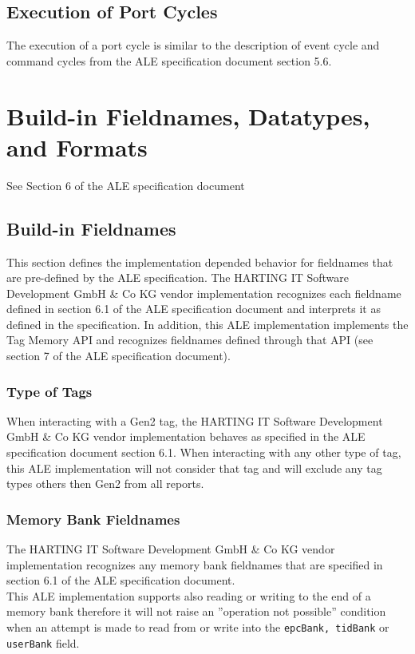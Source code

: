 \documentclass[11pt,a4paper,oneside]{article}
\begin{document}
\subsection{Execution of Port Cycles}
\label{subsec:Execution}
The execution of a port cycle is similar to the description of event cycle and command cycles from the ALE specification document section 5.6.

\section{Build-in Fieldnames, Datatypes, and Formats}
See Section 6 of the ALE specification document

\subsection{	Build-in Fieldnames}
This section defines the implementation depended behavior for fieldnames that are pre-defined by the ALE specification. The HARTING IT Software Development GmbH \& Co KG  vendor implementation recognizes each fieldname defined in section 6.1 of the ALE specification document and interprets it as defined in the specification. In addition, this ALE implementation implements the Tag Memory API and recognizes fieldnames defined through that API (see section 7 of the ALE specification document).

\subsubsection{Type of Tags}
When interacting with a Gen2 tag, the HARTING IT Software Development GmbH \& Co KG  vendor implementation behaves as specified in the ALE specification document section 6.1. When interacting with any other type of tag, this ALE implementation will not consider that tag and will exclude any tag types others then Gen2 from all reports.

\subsubsection{Memory Bank Fieldnames}
The HARTING IT Software Development GmbH \& Co KG  vendor implementation recognizes any memory bank fieldnames that are specified in section 6.1 of the ALE specification document.\\
 This ALE implementation supports also reading or writing to the end of a memory bank therefore it will not raise an  ''operation not possible'' condition when an attempt is made to read from or write into the \texttt{epcBank, tidBank} or \texttt{userBank} field.
\end{document}
